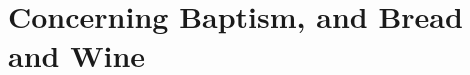 \documentclass[../main.tex]{subfiles}
\begin{document}
	
	\chapter{Concerning Baptism, and Bread and Wine}
	
	
	
	\theendnotes
	\setcounter{endnote}{0}
\end{document}
